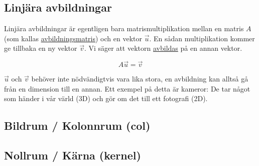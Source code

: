 \documentclass[../main.tex]{subfiles}
\begin{document}
\subsection{Linjära avbildningar}
Linjära avbildningar är egentligen bara matrismultiplikation mellan en matris $A$ (som kallas \underline{avbildningsmatris}) och en vektor $\Vec{u}$. En sådan multiplikation kommer ge tillbaka en ny vektor $\Vec{v}$. Vi säger att vektorn \underline{avbildas} på en annan vektor.

$$A\Vec{u} = \Vec{v}$$

$\Vec{u}$ och $\Vec{v}$ behöver inte nödvändigtvis vara lika stora, en avbildning kan alltså gå från en dimension till en annan. Ett exempel på detta är kameror: De tar något som händer i vår värld (3D) och gör om det till ett fotografi (2D).

\subsection{Bildrum / Kolonnrum (col)}


\subsection{Nollrum / Kärna (kernel)}
\end{document}
